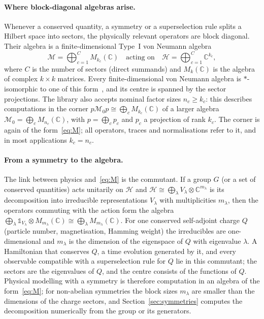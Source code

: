 \documentclass[11pt]{article}
\newcommand{\C}{\mathbb{C}}
\newcommand{\M}{\mathcal{M}}
\begin{document}
\paragraph{Where block-diagonal algebras arise.} Whenever a conserved quantity, a symmetry or a superselection
rule splits a Hilbert space into sectors, the physically relevant operators are block diagonal. Their algebra
is a finite-dimensional Type~I von Neumann algebra
\begin{equation}\label{eq:M}
  \M=\bigoplus_{c=1}^{C}M_{k_c}(\C)\quad\text{acting on}\quad\mathcal H=\bigoplus_{c=1}^C\C^{k_c},
\end{equation}
where $C$ is the number of sectors (direct summands) and $M_{k}(\C)$ is the algebra of complex $k\times k$
matrices. Every finite-dimensional von Neumann algebra is $*$-isomorphic to one of this form~\cite{takesaki2002}, and its centre is
spanned by the sector projections. The library also accepts nominal factor sizes $n_c\ge k_c$: this describes
computations in the corner $p\M_0p\cong\bigoplus_cM_{k_c}(\C)$ of a larger algebra $\M_0=\bigoplus_cM_{n_c}(\C)$,
with $p=\bigoplus_cp_c$ and $p_c$ a projection of rank $k_c$. The corner is again of the form~\eqref{eq:M}; all
operators, traces and normalisations refer to it, and in most applications $k_c=n_c$.
\paragraph{From a symmetry to the algebra.} The link between physics and~\eqref{eq:M} is the commutant. If a group
$G$ (or a set of conserved quantities) acts unitarily on $\mathcal H$ and $\mathcal H\cong\bigoplus_\lambda
V_\lambda\otimes\C^{m_\lambda}$ is its decomposition into irreducible representations $V_\lambda$ with
multiplicities $m_\lambda$, then the operators commuting with the action form the algebra
$\bigoplus_\lambda \mathbb 1_{V_\lambda}\otimes M_{m_\lambda}(\C)\cong\bigoplus_\lambda M_{m_\lambda}(\C)$. For one
conserved self-adjoint charge $Q$ (particle number, magnetisation, Hamming weight) the irreducibles are
one-dimensional and $m_\lambda$ is the dimension of the eigenspace of $Q$ with eigenvalue $\lambda$. A Hamiltonian
that conserves $Q$, a time evolution generated by it, and every observable compatible with a superselection rule
for $Q$ lie in this commutant; the sectors are the eigenvalues of $Q$, and the centre consists of the functions
of $Q$. Physical modelling with a symmetry is therefore computation in an algebra of the form~\eqref{eq:M}; for
non-abelian symmetries the block sizes $m_\lambda$ are smaller than the dimensions of the charge sectors, and
Section~\ref{sec:symmetries} computes the decomposition numerically from the group or its generators.
\end{document}
